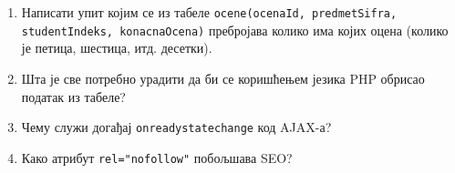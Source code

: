 \documentclass[a4paper]{article}
\begin{document}
\begin{enumerate}
\hrulefill

\hrulefill

\hrulefill

\item Написати упит којим се из табеле \verb|ocene(ocenaId, predmetSifra, studentIndeks, konacnaOcena)| 
пребројава колико има којих оцена (колико је петица, шестица, итд. десетки).

\hrulefill

\hrulefill

\hrulefill

\item Шта је све потребно урадити да би се коришћењем језика PHP обрисао податак из табеле?

\hrulefill

\hrulefill

\hrulefill

\item Чему служи догађај \verb|onreadystatechange| код AJAX-а?

\hrulefill

\hrulefill

\hrulefill

\item Како атрибут \verb|rel="nofollow"| побољшава SEO?

\hrulefill

\hrulefill

\hrulefill

\end{enumerate}
\end{document}
